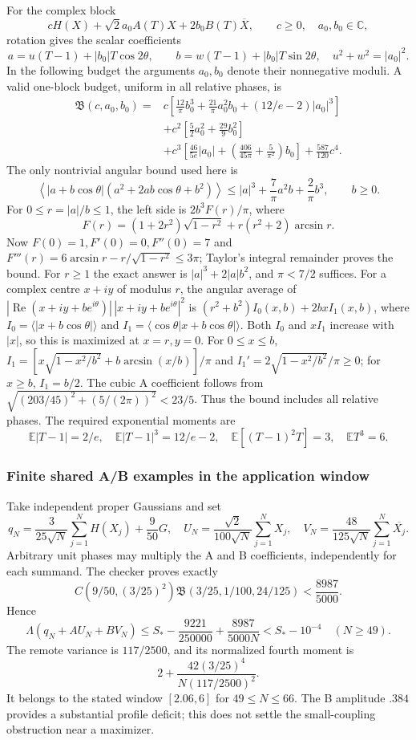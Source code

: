 For the complex block
\[
 cH(X)+\sqrt2a_0A(T)X+2b_0B(T)\overline X,
 \qquad c\ge0,\quad a_0,b_0\in\mathbb C,
\]
rotation gives the scalar coefficients
\[
 a=u(T-1)+|b_0|T\cos2\theta,\qquad b=w(T-1)+|b_0|T\sin2\theta,
 \quad u^2+w^2=|a_0|^2.
\]
In the following budget the arguments $a_0,b_0$ denote their nonnegative
moduli. A valid one-block budget, uniform in all relative phases, is
\begin{align*}
 \mathfrak B(c,a_0,b_0)={}&c\left[
 \frac{12}{\pi}b_0^3+\frac{21}{\pi}a_0^2b_0
                          +(12/e-2)|a_0|^3\right]\\
 &+c^2\left[\frac52a_0^2+\frac{29}{9}b_0^2\right]\\
 &+c^3\left[\frac{46}{5e}|a_0|
       +\left(\frac{406}{45\pi}+\frac5{\pi^2}\right)b_0\right]
 +\frac{587}{120}c^4.
\end{align*}
The only nontrivial angular bound used here is
\[
 \left\langle|a+b\cos\theta|(a^2+2ab\cos\theta+b^2)\right\rangle
 \le|a|^3+\frac7\pi a^2b+\frac2\pi b^3,\qquad b\ge0.
\]
For $0\le r=|a|/b\le1$, the left side is $2b^3F(r)/\pi$, where
\[
 F(r)=(1+2r^2)\sqrt{1-r^2}+r(r^2+2)\arcsin r.
\]
Now $F(0)=1,F'(0)=0,F''(0)=7$ and
$F'''(r)=6\arcsin r-r/\sqrt{1-r^2}\le3\pi$; Taylor's integral
remainder proves the bound. For $r\ge1$ the exact answer is
$|a|^3+2|a|b^2$, and $\pi<7/2$ suffices. For a complex centre $x+iy$ of modulus $r$, the angular average of
$|\operatorname{Re}(x+iy+b e^{i\theta})|\,|x+iy+b e^{i\theta}|^2$
is $(r^2+b^2)I_0(x,b)+2bxI_1(x,b)$, where
$I_0=\langle|x+b\cos\theta|\rangle$ and
$I_1=\langle\cos\theta|x+b\cos\theta|\rangle$.
Both $I_0$ and $xI_1$ increase with $|x|$, so this is maximized at
$x=r,y=0$. For $0\le x\le b$,
$I_1=[x\sqrt{1-x^2/b^2}+b\arcsin(x/b)]/\pi$
and $I_1'=2\sqrt{1-x^2/b^2}/\pi\ge0$; for $x\ge b$, $I_1=b/2$.
The cubic A coefficient follows from
$\sqrt{(203/45)^2+(5/(2\pi))^2}<23/5$.
Thus the bound includes all relative phases. The required exponential
moments are
\[
 \mathbb E|T-1|=2/e,\quad \mathbb E|T-1|^3=12/e-2,
 \quad \mathbb E[(T-1)^2T]=3,\quad\mathbb ET^3=6.
\]

\subsubsection{Finite shared A/B examples in the application window}
Take independent proper Gaussians and set
\[
 q_N=\frac3{25\sqrt N}\sum_{j=1}^N H(X_j)+\frac9{50}G,
 \quad
 U_N=\frac{\sqrt2}{100\sqrt N}\sum_{j=1}^N X_j,
 \quad
 V_N=\frac{48}{125\sqrt N}\sum_{j=1}^N\overline{X_j}.
\]
Arbitrary unit phases may multiply the A and B coefficients, independently
for each summand. The checker
proves exactly
\[
 C(9/50,(3/25)^2)\mathfrak B(3/25,1/100,24/125)
 <\frac{8987}{5000}.
\]
Hence
\[
 \boxed{\Lambda(q_N+AU_N+BV_N)
 \le S_*-\frac{9221}{250000}+\frac{8987}{5000N}
 <S_*-10^{-4}\quad(N\ge49).}
\]
The remote variance is $117/2500$, and its normalized fourth moment is
\[
 2+\frac{42(3/25)^4}{N(117/2500)^2}.
\]
It belongs to the stated window $[2.06,6]$ for $49\le N\le66$.
The B amplitude $.384$ provides a substantial profile deficit;
this does not settle the small-coupling obstruction near a maximizer.


